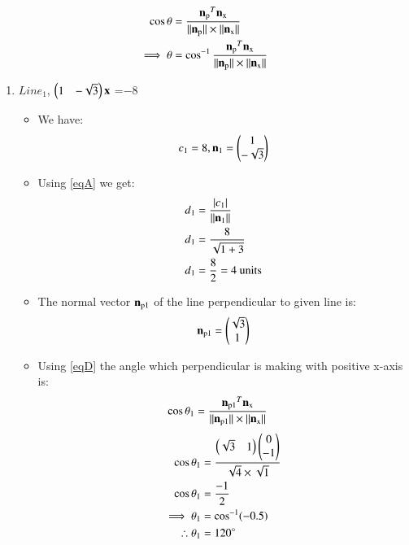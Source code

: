 \documentclass[journal,12pt,twocolumn]{IEEEtran}
\begin{document}
\begin{enumerate}
\begin{itemize}
\begin{align}
\cos \theta&=\frac{\vec{n\textsubscript{p}}^T\vec{n\textsubscript{x}}}{\norm{\vec{n\textsubscript{p}}}\times\norm{\vec{n\textsubscript{x}}}}
  \\
 \implies \theta &= \cos^{-1}\frac{\vec{n\textsubscript{p}}^T\vec{n\textsubscript{x}}}{\norm{\vec{n\textsubscript{p}}}\times\norm{\vec{n\textsubscript{x}}}}\label{eqD}
\end{align}
\end{itemize}
\begin{enumerate}[label=\alph*.]
\item $Line_1$, $\myvec{1&-\sqrt{3}}\vec{x}$ =$-8$
\begin{itemize}
\item We have:
\begin{align}
 c\textsubscript{1}=8 , {\vec{n\textsubscript{1}}}=\myvec{1\\-\sqrt{3}}   
\end{align}
\item Using \eqref{eqA} we get:
\begin{align}
d\textsubscript{1}&=\frac { \left| c\textsubscript{1} \right| }{\norm{\vec{n\textsubscript{1}}}}
\\
d\textsubscript{1}&=\frac{8}{\sqrt{1+3}} 
\\
d\textsubscript{1}&=\frac{8}{2}=4\text{ units}
\end{align}
\item The normal vector $\vec{n\textsubscript{p1}}$ of the line perpendicular to given line is: 
\begin{align}
    \vec{n\textsubscript{p1}}=\myvec{\sqrt{3}\\1}
\end{align}
\item Using \eqref{eqD} the angle which perpendicular is making with positive x-axis is:
\begin{align}
   \cos\theta\textsubscript{1} &= \frac{\vec{n\textsubscript{p1}}^T\vec{n\textsubscript{x}}}{\norm{\vec{n\textsubscript{p1}}}\times\norm{\vec{n\textsubscript{x}}}}
    \end{align}
    \begin{align}
   \cos\theta\textsubscript{1} &= \frac{\myvec{\sqrt{3}&1}\myvec{0\\-1}}{\sqrt{4}\times\sqrt{1}}
    \\
 \cos\theta\textsubscript{1} &= \frac{-1}{2}
 \\
 \implies \theta\textsubscript{1}&=\cos^{-1}(-0.5)
 \\
 \therefore  \theta\textsubscript{1}&=120\degree

\end{align}
\end{itemize}
\end{enumerate}
\end{enumerate}
\end{document}
